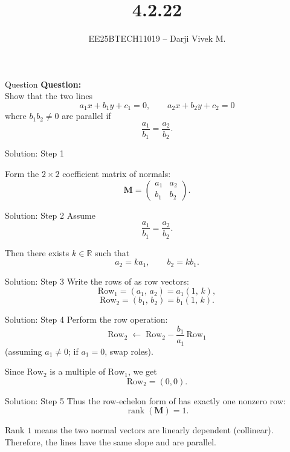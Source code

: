 \documentclass{beamer}
\title{4.2.22}
\author{EE25BTECH11019 -- Darji Vivek M.}
\date{}
\newcommand{\myvec}[1]{\begin{pmatrix}#1\end{pmatrix}}
\renewcommand{\vec}[1]{\mathbf{#1}}
\begin{document}
\begin{frame}
\begin{titlepage}

\end{titlepage}
\end{frame}
\begin{frame}{Question}
\textbf{Question:}\\
Show that the two lines
\[
a_1 x + b_1 y + c_1 = 0,\qquad a_2 x + b_2 y + c_2 = 0
\]
where $b_1 b_2 \neq 0$ are parallel if 
\[
\frac{a_1}{b_1}=\frac{a_2}{b_2}.
\]
\end{frame}


\begin{frame}{Solution: Step 1}

Form the $2\times2$ coefficient matrix of normals:
\[
\vec{M} = \myvec{a_1 & a_2 \\ b_1 & b_2}.
\]
\end{frame}


\begin{frame}{Solution: Step 2}
Assume 
\[
\dfrac{a_1}{b_1}=\dfrac{a_2}{b_2}.
\]

Then there exists \(k \in \mathbb{R}\) such that
\[
a_2 = k a_1, 
\qquad 
b_2 = k b_1.
\]
\end{frame}


\begin{frame}{Solution: Step 3}
Write the rows of \vec{M} as row vectors:
\[
\text{Row}_1 = (a_1,\,a_2) = a_1(1,\,k),
\]
\[
\text{Row}_2 = (b_1,\,b_2) = b_1(1,\,k).
\]
\end{frame}


\begin{frame}{Solution: Step 4}
Perform the row operation:
\[
\text{Row}_2 \;\leftarrow\; \text{Row}_2 - \frac{b_1}{a_1}\,\text{Row}_1
\]
(assuming \(a_1\neq 0\); if \(a_1=0\), swap roles).

Since \(\text{Row}_2\) is a multiple of \(\text{Row}_1\), we get
\[
\text{Row}_2 = (0,0).
\]
\end{frame}


\begin{frame}{Solution: Step 5}
Thus the row-echelon form of \vec{M} has exactly one nonzero row:
\[
\operatorname{rank}(\vec{M}) = 1.
\]

Rank \(1\) means the two normal vectors are linearly dependent (collinear).  
Therefore, the lines have the same slope and are parallel.
\end{frame}
\end{document}
